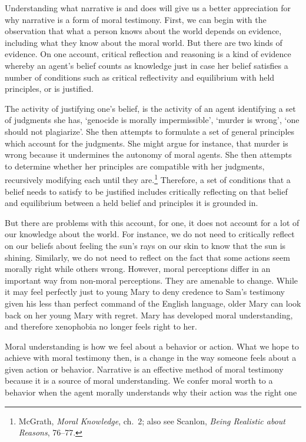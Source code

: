 \documentclass[phdthesis,12pt,final,a4paper]{wuthesis}
\theoremstyle{definition}
\theoremstyle{definition}
\theoremstyle{definition}
\theoremstyle{definition}
\theoremstyle{remark}
\begin{document}
Understanding what narrative is and does will give us a better appreciation for why narrative is a form of moral testimony. First, we can begin with the observation that what a person knows about the world depends on evidence, including what they know about the moral world. But there are two kinds of evidence. On one account, critical reflection and reasoning is a kind of evidence whereby an agent's belief counts as knowledge just in case her belief satisfies a number of conditions such as critical reflectivity and equilibrium with held principles, or is justified.

The activity of justifying one's belief, is the activity of an agent identifying a set of judgments she has, `genocide is morally impermissible', `murder is wrong', `one should not plagiarize'. She then attempts to formulate a set of general principles which account for the judgments. She might argue for instance, that murder is wrong because it undermines the autonomy of moral agents. She then attempts to determine whether her principles are compatible with her judgments, recursively modifying each until they are.\footnote{McGrath, \emph{Moral {Knowledge}}, ch.~2; also see Scanlon, \emph{Being Realistic about Reasons}, 76--77.} Therefore, a set of conditions that a belief needs to satisfy to be justified includes critically reflecting on that belief and equilibrium between a held belief and principles it is grounded in.

But there are problems with this account, for one, it does not account for a lot of our knowledge about the world. For instance, we do not need to critically reflect on our beliefs about feeling the sun's rays on our skin to know that the sun is shining. Similarly, we do not need to reflect on the fact that some actions seem morally right while others wrong. However, moral perceptions differ in an important way from non-moral perceptions. They are amenable to change. While it may feel perfectly just to young Mary to deny credence to Sam's testimony given his less than perfect command of the English language, older Mary can look back on her young Mary with regret. Mary has developed moral understanding, and therefore xenophobia no longer feels right to her.

Moral understanding is how we feel about a behavior or action. What we hope to achieve with moral testimony then, is a change in the way someone feels about a given action or behavior. Narrative is an effective method of moral testimony because it is a source of moral understanding. We confer moral worth to a behavior when the agent morally understands why their action was the right one
\end{document}

